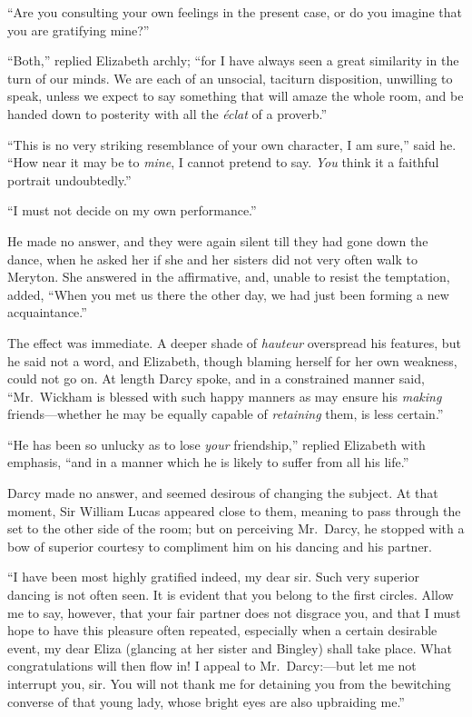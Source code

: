 \documentclass[12pt,english,oneside]{book}
\begin{document}
{}``Are you consulting your own feelings in the present case, or
do you imagine that you are gratifying mine?''

{}``Both,'' replied Elizabeth archly; {}``for I have always seen
a great similarity in the turn of our minds. We are each of an unsocial,
taciturn disposition, unwilling to speak, unless we expect to say
something that will amaze the whole room, and be handed down to posterity
with all the \emph{\'{e}clat} of a proverb.''

{}``This is no very striking resemblance of your own character, I
am sure,'' said he. {}``How near it may be to \textit{mine}, I cannot
pretend to say. \textit{You} think it a faithful portrait undoubtedly.''

{}``I must not decide on my own performance.''

He made no answer, and they were again silent till they had gone down
the dance, when he asked her if she and her sisters did not very often
walk to Meryton. She answered in the affirmative, and, unable to resist
the temptation, added, {}``When you met us there the other day, we
had just been forming a new acquaintance.''

The effect was immediate. A deeper shade of \emph{hauteur} overspread
his features, but he said not a word, and Elizabeth, though blaming
herself for her own weakness, could not go on. At length Darcy spoke,
and in a constrained manner said, {}``Mr.\ Wickham is blessed with
such happy manners as may ensure his \textit{making} friends\mbox{---}whether
he may be equally capable of \textit{retaining} them, is less certain.''

{}``He has been so unlucky as to lose \textit{your} friendship,''
replied Elizabeth with emphasis, {}``and in a manner which he is
likely to suffer from all his life.''

Darcy made no answer, and seemed desirous of changing the subject.
At that moment, Sir William Lucas appeared close to them, meaning
to pass through the set to the other side of the room; but on perceiving
Mr.\ Darcy, he stopped with a bow of superior courtesy to compliment
him on his dancing and his partner.

{}``I have been most highly gratified indeed, my dear sir. Such very
superior dancing is not often seen. It is evident that you belong
to the first circles. Allow me to say, however, that your fair partner
does not disgrace you, and that I must hope to have this pleasure
often repeated, especially when a certain desirable event, my dear
Eliza (glancing at her sister and Bingley) shall take place. What
congratulations will then flow in! I appeal to Mr.\ Darcy:\mbox{---}but
let me not interrupt you, sir. You will not thank me for detaining
you from the bewitching converse of that young lady, whose bright
eyes are also upbraiding me.''
\end{document}
